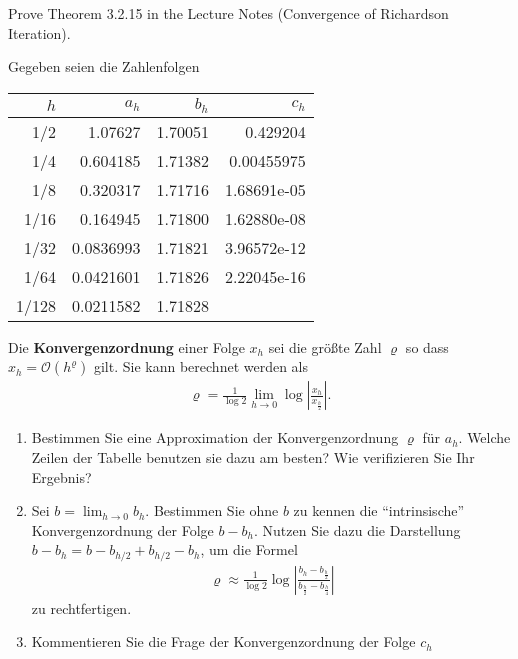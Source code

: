 
\begin{Sheet}
  \label{sheet7}

  \begin{Problem}
    Prove Theorem 3.2.15 in the Lecture Notes (Convergence of Richardson Iteration).
  \end{Problem}

  \begin{Problem}
  	Gegeben seien die Zahlenfolgen
  	\begin{center}
  		\begin{tabular}{|r|r|r|r|}
  			\hline $h$ & $a_h$ & $b_h$ & $c_h$ \\\hline
  			1/2   & 1.07627    &  1.70051 & 0.429204    \\
  			1/4   & 0.604185   &  1.71382 & 0.00455975  \\
  			1/8   & 0.320317   &  1.71716 & 1.68691e-05 \\
  			1/16  & 0.164945   &  1.71800 & 1.62880e-08 \\
  			1/32  & 0.0836993  &  1.71821 & 3.96572e-12 \\
  			1/64  & 0.0421601  &  1.71826 & 2.22045e-16 \\
  			1/128 & 0.0211582  &  1.71828 & \\
  			\hline
  		\end{tabular}      
  	\end{center}
  	
  	Die \textbf{Konvergenzordnung} einer Folge $x_h$ sei die größte
  	Zahl $\varrho$ so dass
  	$x_h = \mathcal O(h^\varrho)$ gilt. Sie kann berechnet werden als
  	\begin{gather*}
  	\varrho = \frac1{\log 2} \lim_{h\to 0} \log\left|\frac{x_h}{x_{\frac h2}}\right|.
  	\end{gather*}        
  	
  	\begin{enumerate}
  		\item Bestimmen Sie eine Approximation der Konvergenzordnung $\varrho$ für $a_h$.
  		Welche Zeilen der Tabelle benutzen sie dazu am besten? Wie
  		verifizieren Sie Ihr Ergebnis?
  		\item Sei $b=\lim_{h\to0} b_h$. Bestimmen Sie ohne $b$ zu kennen
  		die ``intrinsische'' Konvergenzordnung der Folge $b-b_h$. Nutzen
  		Sie dazu die Darstellung $b-b_h = b-b_{h/2} + b_{h/2} - b_h$, um die Formel
  		\begin{gather*}
  		\varrho \approx \frac1{\log 2}
  		\log \left|\frac{b_h - b_{\frac h2}}{b_{\frac h2} -b_{\frac h4}}\right|
  		\end{gather*}
  		zu rechtfertigen.
  		\item Kommentieren Sie die Frage der Konvergenzordnung der Folge $c_h$
  	\end{enumerate}
  \end{Problem}


\end{Sheet}
